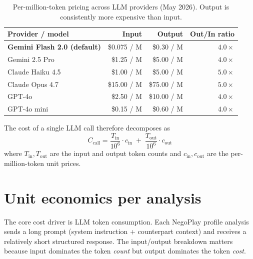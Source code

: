 \documentclass[11pt, a4paper, oneside]{report}
\begin{document}
\begin{table}[H]
\centering\small
\caption{Per-million-token pricing across LLM providers (May 2026).
Output is consistently more expensive than input.}
\label{tab:llm_pricing}
\begin{tabular}{l r r r}
\toprule
\textbf{Provider / model} & \textbf{Input} & \textbf{Output} & \textbf{Out/In ratio} \\
\midrule
\textbf{Gemini Flash 2.0 (default)} & \$0.075 / M & \$0.30 / M  & $\mathbf{4.0\times}$ \\
Gemini 2.5 Pro                      & \$1.25 / M  & \$5.00 / M  & $4.0\times$ \\
Claude Haiku 4.5                    & \$1.00 / M  & \$5.00 / M  & $5.0\times$ \\
Claude Opus 4.7                     & \$15.00 / M & \$75.00 / M & $5.0\times$ \\
GPT-4o                              & \$2.50 / M  & \$10.00 / M & $4.0\times$ \\
GPT-4o mini                         & \$0.15 / M  & \$0.60 / M  & $4.0\times$ \\
\bottomrule
\end{tabular}
\end{table}

The cost of a single LLM call therefore decomposes as
\begin{equation}
C_{\text{call}} = \frac{T_{\text{in}}}{10^6}\cdot c_{\text{in}} \;+\; \frac{T_{\text{out}}}{10^6}\cdot c_{\text{out}}
\end{equation}
where $T_{\text{in}}, T_{\text{out}}$ are the input and output token counts
and $c_{\text{in}}, c_{\text{out}}$ are the per-million-token unit prices.

\section{Unit economics per analysis}

The core cost driver is LLM token consumption. Each NegoPlay profile
analysis sends a long prompt (system instruction + counterpart context)
and receives a relatively short structured response. The input/output
breakdown matters because input dominates the token \emph{count} but
output dominates the token \emph{cost}.
\end{document}
